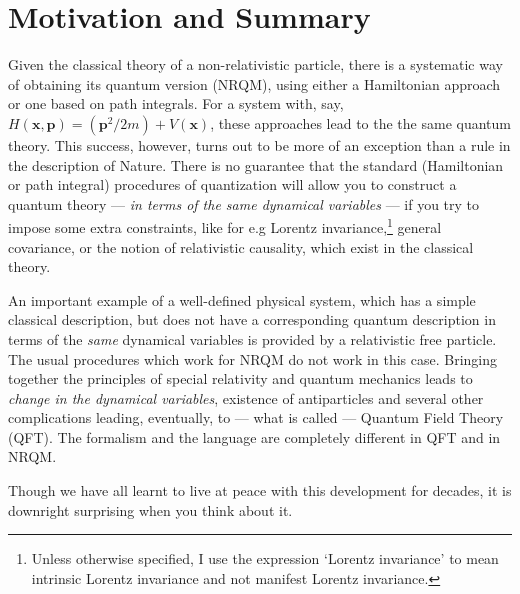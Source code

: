 \documentclass{article}
\begin{document}
\section{Motivation and Summary}



Given the classical theory of a non-relativistic particle, there is  a systematic way of obtaining its quantum version (NRQM), using either  a Hamiltonian approach or one based on  path integrals. For a system with, say, $H(\bm{x},\bm{p})=(\bm{p}^2/2m) + V(\bm{x})$,  these approaches lead to the the same quantum theory.
This success, however, turns out to be more of an exception than a rule in the description of Nature.   There is  no guarantee that the standard (Hamiltonian or path integral) procedures of quantization  will allow you to construct a quantum theory --- \textit{in terms of the same dynamical variables} --- if you try to impose  some   extra  constraints, like for e.g Lorentz invariance,\footnote{Unless otherwise specified, I use the expression `Lorentz invariance' to mean intrinsic Lorentz invariance and not manifest Lorentz invariance.} general covariance, or the notion of relativistic causality, which exist in the classical theory. 

An important example of a well-defined physical system, 
which has a simple classical description, but does not have a corresponding quantum description in terms of the \textit{same} dynamical variables
is provided by a relativistic free particle.
The usual procedures which work for NRQM do not work  in this case.  
Bringing together the principles of special relativity and quantum mechanics leads to \textit{change in the dynamical variables}, existence of antiparticles and several other complications leading, eventually, to --- what is called --- Quantum Field Theory (QFT). The formalism and the language are completely different in QFT and in NRQM. 
 
Though we have all learnt to live at peace with this development for decades, it is downright surprising  when you think about it. 
\end{document}
